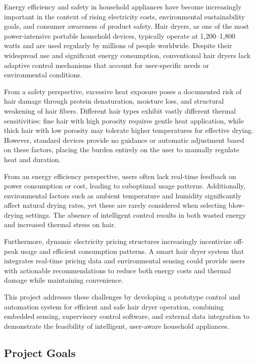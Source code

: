 \documentclass[11pt,a4paper]{article}
\begin{document}
Energy efficiency and safety in household appliances have become increasingly important in the context of rising electricity costs, environmental sustainability goals, and consumer awareness of product safety. Hair dryers, as one of the most power-intensive portable household devices, typically operate at 1,200--1,800 watts and are used regularly by millions of people worldwide. Despite their widespread use and significant energy consumption, conventional hair dryers lack adaptive control mechanisms that account for user-specific needs or environmental conditions.

From a safety perspective, excessive heat exposure poses a documented risk of hair damage through protein denaturation, moisture loss, and structural weakening of hair fibers. Different hair types exhibit vastly different thermal sensitivities: fine hair with high porosity requires gentle heat application, while thick hair with low porosity may tolerate higher temperatures for effective drying. However, standard devices provide no guidance or automatic adjustment based on these factors, placing the burden entirely on the user to manually regulate heat and duration.

From an energy efficiency perspective, users often lack real-time feedback on power consumption or cost, leading to suboptimal usage patterns. Additionally, environmental factors such as ambient temperature and humidity significantly affect natural drying rates, yet these are rarely considered when selecting blow-drying settings. The absence of intelligent control results in both wasted energy and increased thermal stress on hair.

Furthermore, dynamic electricity pricing structures increasingly incentivize off-peak usage and efficient consumption patterns. A smart hair dryer system that integrates real-time pricing data and environmental sensing could provide users with actionable recommendations to reduce both energy costs and thermal damage while maintaining convenience.

This project addresses these challenges by developing a prototype control and automation system for efficient and safe hair dryer operation, combining embedded sensing, supervisory control software, and external data integration to demonstrate the feasibility of intelligent, user-aware household appliances.

\subsection{Project Goals}
\end{document}
